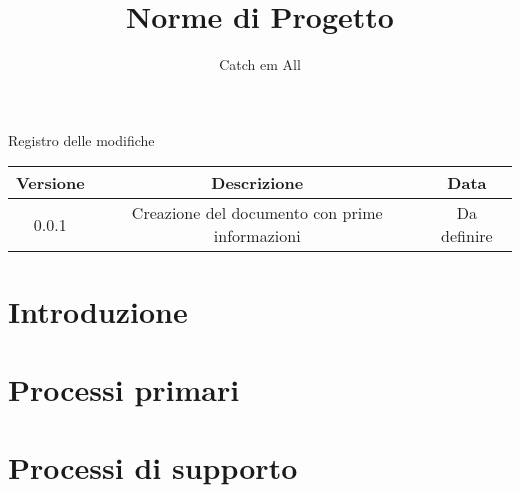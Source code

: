 \documentclass{article}
\title{Norme di Progetto}
\author{Catch em All}
\begin{document}
\date{}
\maketitle

\pagebreak

Registro delle modifiche
\begin{center}
\begin{tabular}{ c | c | c } 
 Versione & Descrizione & Data \\
 \hline
 0.0.1 & Creazione del documento con prime informazioni & Da definire \\
\end{tabular}
\end{center}

\pagebreak

\clearpage
\tableofcontents
\clearpage

\section{Introduzione}


\section{Processi primari}


\section{Processi di supporto}

\end{document}
